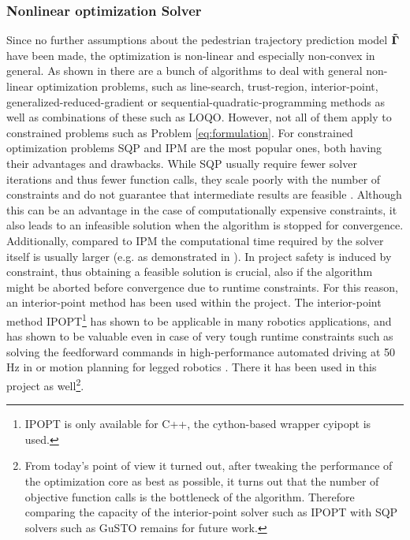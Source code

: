 \subsubsection{Nonlinear optimization Solver} 
Since no further assumptions about the pedestrian trajectory prediction model $\distmodel[]$ have been made, the optimization is non-linear and especially non-convex in general. As shown in \cite{Gould2003}\cite{Parkinson2018}\cite{Freund2004} there are a bunch of algorithms to deal with general non-linear optimization problems, such as line-search, trust-region, interior-point, generalized-reduced-gradient or sequential-quadratic-programming methods as well as combinations of these such as LOQO. However, not all of them apply to constrained problems such as Problem \ref{eq:formulation}. For constrained optimization problems \ac{SQP} and \ac{IPM} are the most popular ones, both having their advantages and drawbacks. While \ac{SQP} usually require fewer solver iterations and thus fewer function calls, they scale poorly with the number of constraints and do not guarantee that intermediate results are feasible \cite{Dehdari2013}\cite{Parkinson2018}. Although this can be an advantage in the case of computationally expensive constraints, it also leads to an infeasible solution when the algorithm is stopped for convergence. Additionally, compared to \ac{IPM} the computational time required by the solver itself is usually larger (e.g. as demonstrated in \cite{Dehdari2013}).
\newline
In project \project safety is induced by constraint, thus obtaining a feasible solution is crucial, also if the algorithm might be aborted before convergence due to runtime constraints. For this reason, an interior-point method has been used within the project. The interior-point method \ac{IPOPT}\footnote{\ac{IPOPT} is only available for C++, the cython-based wrapper cyipopt is used.} \cite{Wachter2006} has shown to be applicable in many robotics applications, and has shown to be valuable even in case of very tough runtime constraints such as solving the feedforward commands in high-performance automated driving at 50 Hz in \cite{Spielberge2019} or motion planning for legged robotics \cite{Winkler2018}. There it has been used in this project as well\footnote{From today's point of view it turned out, after tweaking the performance of the optimization core as best as possible, it turns out that the number of objective function calls is the bottleneck of the algorithm. Therefore comparing the capacity of the interior-point solver such as \ac{IPOPT} with \ac{SQP} solvers such as \ac{GuSTO} remains for future work.}.

